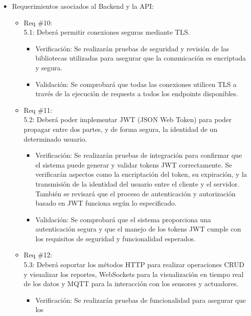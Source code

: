 \begin{itemize}
	\item Requerimientos asociados al Backend y la API:
	      \begin{itemize}
		      \item Req \#10:\\ 5.1: Deberá permitir conexiones seguras mediante TLS.
		            \begin{itemize}
			            \item Verificación: Se realizarán pruebas de seguridad y revisión de las bibliotecas
			                  utilizadas para asegurar que la comunicación es encriptada y segura.
			            \item Validación: Se comprobará que todas las conexiones utilicen TLS a través de la
			                  ejecución de requests a todos los endpoints disponibles.
		            \end{itemize}
		      \item Req \#11: \\ 5.2: Deberá poder implementar JWT (JSON Web Token) para poder
		            propagar entre dos partes, y de forma segura, la identidad de un determinado
		            usuario.
		            \begin{itemize}
			            \item Verificación: Se realizarán pruebas de integración para confirmar que el
			                  sistema puede generar y validar tokens JWT correctamente. Se verificarán
			                  aspectos como la encriptación del token, su expiración, y la transmisión de la
			                  identidad del usuario entre el cliente y el servidor. También se revisará que
			                  el proceso de autenticación y autorización basado en JWT funciona según lo
			                  especificado.
			            \item Validación: Se comprobará que el sistema proporciona una autenticación segura y
			                  que el manejo de los tokens JWT cumple con los requisitos de seguridad y
			                  funcionalidad esperados.
		            \end{itemize}
		      \item Req \#12: \\ 5.3: Deberá soportar los métodos HTTP para realizar operaciones
		            CRUD y visualizar los reportes, WebSockets para la visualización en tiempo real
		            de los datos y MQTT para la interacción con los sensores y actuadores.
		            \begin{itemize}
			            \item Verificación: Se realizarán pruebas de funcionalidad para asegurar que los

\end{itemize}
\end{itemize}
\end{itemize}
